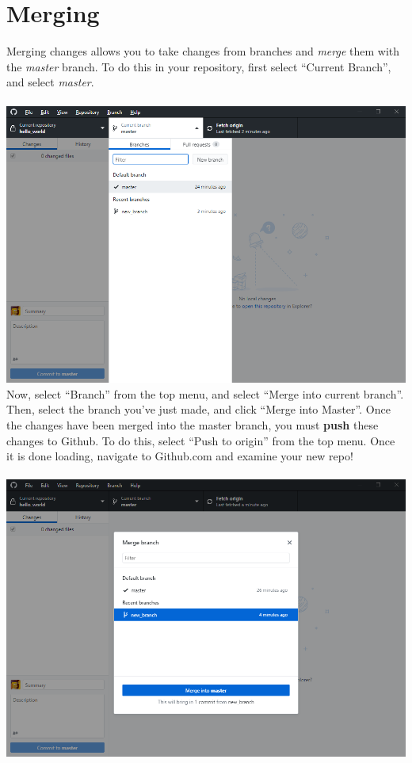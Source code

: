 \documentclass[12pt, letter]{article}
\begin{document}
    \section{Merging}
    Merging changes allows you to take changes from branches and \emph{merge} them with the \emph{master} branch. To do this in your repository, first select ``Current Branch'', and select \emph{master}. \\ \\ %
    \includegraphics{screenshots/shot9.bmp}
    \\
    Now, select ``Branch'' from the top menu, and select ``Merge into current branch''. Then, select the branch you've just made, and click ``Merge into Master''. Once the changes have been merged into the master branch, you must \textbf{push} these changes to Github. To do this, select ``Push to origin'' from the top menu. Once it is done loading, navigate to Github.com and examine your new repo! \\ \\ %
    \includegraphics{screenshots/shot10.bmp} \\
\end{document}
